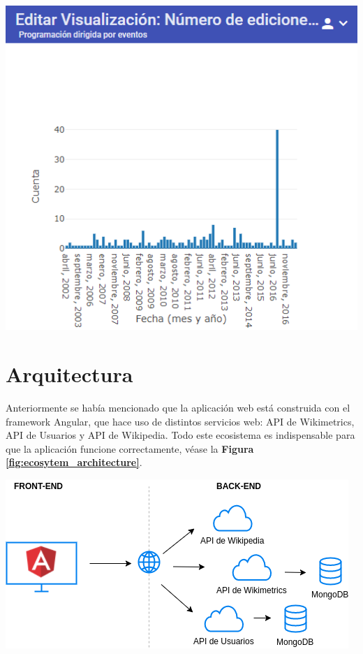 \begin{enumerate}
  \begin{center}
    \bigbreak
    \includegraphics[scale=0.7]{images/marco_aplicativo/vis_default_count_month_year.png}
    \label{fig:count_month_year}
    \bigbreak
  \end{center}
  
  

\end{enumerate}

\section{Arquitectura}
Anteriormente se había mencionado que la aplicación web está construida con el framework Angular, que hace uso de distintos servicios web: API de Wikimetrics, API de Usuarios y API de Wikipedia. Todo este ecosistema es indispensable para que la aplicación funcione correctamente, véase la \textbf{Figura \ref{fig:ecosytem_architecture}}.

\begin{center}
    \bigbreak
    \includegraphics[scale=0.7]{images/marco_aplicativo/ecosystem.png}
    \label{fig:ecosytem_architecture}
    \bigbreak
\end{center}


